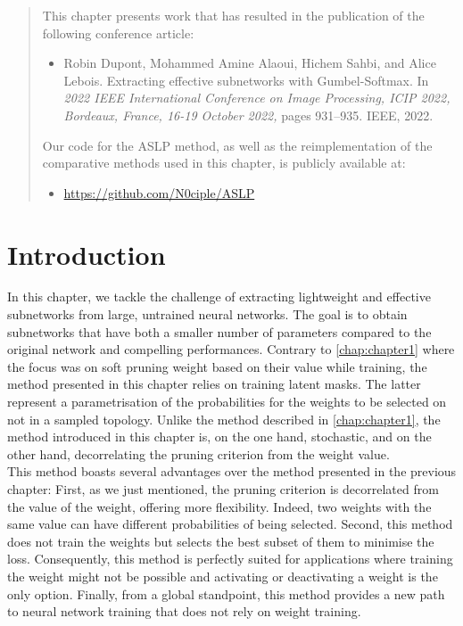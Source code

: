 \begin{abstract}
  \noindent This chapter presents work that has resulted in the publication of the
  following conference article:
  \begin{itemize}
    \item Robin Dupont, Mohammed Amine Alaoui, Hichem Sahbi, and Alice
          Lebois. Extracting effective subnetworks with Gumbel-Softmax. In \textit{2022
            IEEE International Conference on Image Processing, ICIP 2022, Bordeaux,
            France, 16-19 October 2022,} pages 931–935. IEEE, 2022.
  \end{itemize}

  \noindent Our code for the \ac{ASLP} method, as well as the reimplementation
  of the comparative methods used in this chapter, is publicly available at:
  \begin{itemize}
    \item \url{https://github.com/N0ciple/ASLP}
  \end{itemize}

\end{abstract}

\section{Introduction}

In this chapter, we tackle the challenge of extracting lightweight and effective
subnetworks from large, untrained neural networks. The goal is to obtain
subnetworks that have both a smaller number of parameters compared to the
original network and compelling performances. Contrary to \cref{chap:chapter1}
where the focus was on soft pruning weight based on their value while training,
the method presented in this chapter relies on training latent masks. The latter
represent a parametrisation of the probabilities for the weights to be selected
on not in a sampled topology. Unlike the method described in
\cref{chap:chapter1}, the method introduced in this chapter is, on the one hand,
stochastic, and on the other hand, decorrelating the pruning criterion from the
weight value.\\

This method boasts several advantages over the method presented in the previous
chapter: First, as we just mentioned, the pruning criterion is decorrelated from
the value of the weight, offering more flexibility. Indeed, two weights with the
same value can have different probabilities of being selected. Second, this
method does not train the weights but selects the best subset of them to
minimise the loss. Consequently, this method is perfectly suited for
applications where training the weight might not be possible and activating or
deactivating a weight is the only option. Finally, from a global standpoint,
this method provides a new path to neural network training that does not rely on
weight training.\\

